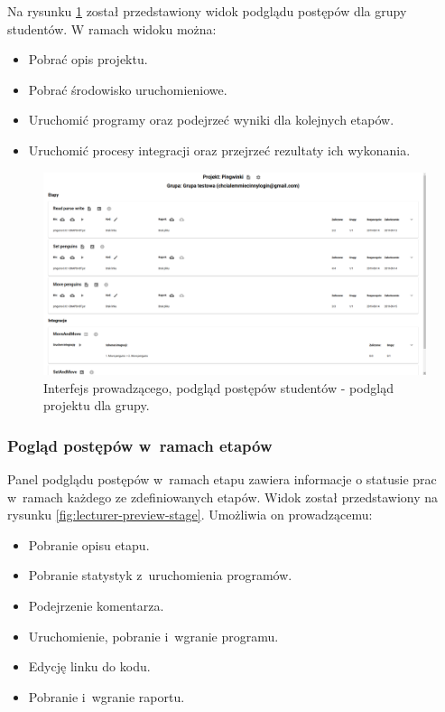 Na rysunku \ref{fig:lecturer-interface-preview} został przedstawiony widok podglądu postępów dla grupy studentów.
W ramach widoku można:
\begin{itemize}
    \item Pobrać opis projektu.
    \item Pobrać środowisko uruchomieniowe.
    \item Uruchomić programy oraz podejrzeć wyniki dla kolejnych etapów.
    \item Uruchomić procesy integracji oraz przejrzeć rezultaty ich wykonania.
\end{itemize}

\vfill

\begin{figure}[H]
    \centering
    \includegraphics[width = 16cm]{chapter04/lecturer_interface_preview.png}
    \caption{Interfejs prowadzącego, podgląd postępów studentów - podgląd projektu dla grupy.}
    \label{fig:lecturer-interface-preview}
\end{figure}


\subsubsection{Pogląd postępów w~ramach etapów}

Panel podglądu postępów w~ramach etapu zawiera informacje o statusie prac w~ramach każdego ze zdefiniowanych etapów.
Widok został przedstawiony na rysunku \ref{fig:lecturer-preview-stage}.
Umożliwia on prowadzącemu:
\begin {itemize}
    \item Pobranie opisu etapu.
    \item Pobranie statystyk z~uruchomienia programów.
    \item Podejrzenie komentarza.
    \item Uruchomienie, pobranie i~wgranie programu.
    \item Edycję linku do kodu.
    \item Pobranie i~wgranie raportu.
\end {itemize}

